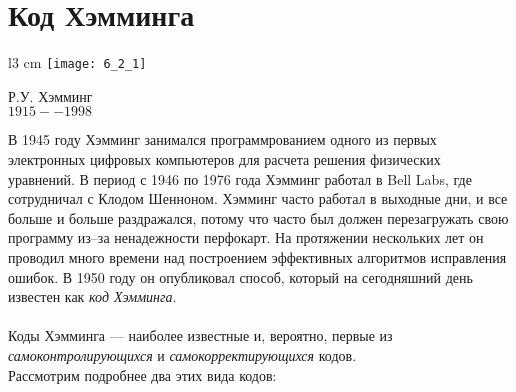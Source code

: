 \section{Код Хэмминга}
\begin{wrapfigure}[14]{l}{3 cm}
\texttt{[image: 6\_2\_1]}
\begin{center}
\caption{}
\footnotesize{Р.У. Хэмминг}
\\\footnotesize{$1915 -- 1998$}
\end{center}
\end{wrapfigure}
В 1945 году Хэмминг занимался программрованием одного из первых электронных цифровых компьютеров для расчета решения физических уравнений.  В период с 1946 по 1976 года Хэмминг работал в Bell Labs, где сотрудничал с Клодом Шенноном. Хэмминг часто работал в выходные дни, и все больше и больше раздражался, потому что часто был должен перезагружать свою программу из--за ненадежности перфокарт. На протяжении нескольких лет он проводил много времени над построением эффективных алгоритмов исправления ошибок. В 1950 году он опубликовал способ, который на сегодняшний день известен как \emph{код Хэмминга}. \\\\Коды Хэмминга — наиболее известные и, вероятно, первые из \emph{самоконтролирующихся} и \emph{самокорректирующихся} кодов.\\
Рассмотрим подробнее два этих вида кодов:
